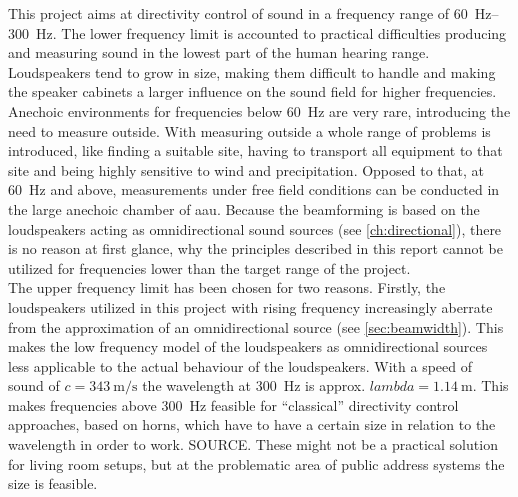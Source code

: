 This project aims at directivity control of sound in a frequency range of \SIrange{60}{300}{\hertz}. The lower frequency limit is accounted to practical difficulties producing and measuring sound in the lowest part of the human hearing range. Loudspeakers tend to grow in size, making them difficult to handle and making the speaker cabinets a larger influence on the sound field for higher frequencies. Anechoic environments for frequencies below \SI{60}{\hertz} are very rare, introducing the need to measure outside. With measuring outside a whole range of problems is introduced, like finding a suitable site, having to transport all equipment to that site and being highly sensitive to wind and precipitation. Opposed to that, at \SI{60}{\hertz} and above, measurements under free field conditions can be conducted in the large anechoic chamber of \gls{aau}. Because the beamforming is based on the loudspeakers acting as omnidirectional sound sources (see \autoref{ch:directional}), there is no reason at first glance, why the principles described in this report cannot be utilized for frequencies lower than the target range of the project.\\
The upper frequency limit has been chosen for two reasons. Firstly, the loudspeakers utilized in this project with rising frequency increasingly aberrate from the approximation of an omnidirectional source (see \autoref{sec:beamwidth}). This makes the low frequency model of the loudspeakers as omnidirectional sources less applicable to the actual behaviour of the loudspeakers. With a speed of sound of $c=\SI{343}{\meter\per\second}$ the wavelength at \SI{300}{\hertz} is approx. $lambda=\SI{1.14}{\meter}$. This makes frequencies above \SI{300}{\hertz} feasible for ``classical'' directivity control approaches, based on horns, which have to have a certain size in relation to the wavelength in order to work. SOURCE. These might not be a practical solution for living room setups, but at the problematic area of public address systems the size is feasible.\\

